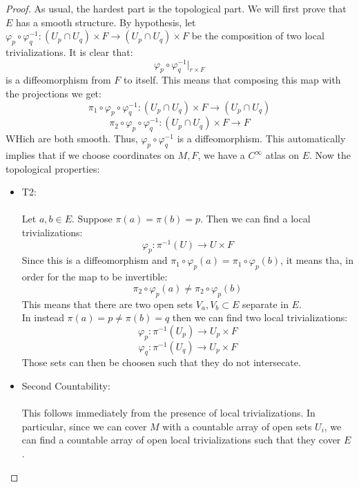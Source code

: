 \documentclass[12pt,a4paper]{report}
\theoremstyle{definition}
\theoremstyle{Theorem}
\theoremstyle{definition}
\theoremstyle{definition}
\begin{document}
	\begin{proof}
		As usual, the hardest part is the topological part. We will first prove that $E$ has a smooth structure. By hypothesis, let $\varphi_p\circ \varphi_q^{-1}:(U_p\cap U_q)\times F\rightarrow (U_p\cap U_q)\times F$ be the composition of two local trivializations. It is clear that:
		$$\varphi_p\circ \varphi_q^{-1}\bigg|_{r\times F}$$
		is a diffeomorphism from $F$ to itself. This means that composing this map with the projections we get:
		$$\pi_1\circ \varphi_p\circ \varphi_q^{-1}:(U_p\cap U_q)\times F\rightarrow (U_p\cap U_q)$$
		$$\pi_2\circ \varphi_p\circ \varphi_q^{-1}:(U_p\cap U_q)\times F\rightarrow F$$
		WHich are both smooth. Thus, $\varphi_p\circ \varphi_q^{-1}$ is a diffeomorphism. This automatically implies that if we choose coordinates on $M,F$, we have a $C^\infty$ atlas on $E$. Now the topological properties:
		\begin{itemize}
			\item T2:\\
			\\
			Let $a,b\in E$. Suppose $\pi(a)=\pi(b)=p$. Then we can find a local trivializations:
			$$\varphi_p:\pi^{-1}(U)\rightarrow U\times F$$
			Since this is a diffeomorphism and $\pi_1\circ \varphi_p(a)=\pi_1\circ\varphi_p(b)$, it means tha, in order for the map to be invertible:
			$$\pi_2\circ \varphi_p(a)\neq \pi_2\circ \varphi_p(b)$$
			This means that there are two open sets $V_a,V_b\subset E$ separate in $E$.\\
			In instead $\pi(a)=p\neq \pi(b)=q$ then we can find two local trivializations:
			$$\varphi_p:\pi^{-1}(U_p)\rightarrow U_p\times F$$
			$$\varphi_q:\pi^{-1}(U_q)\rightarrow U_p\times F$$
			Those sets can then be choosen such that they do not intersecate.
			\item Second Countability:\\
			\\
			This follows immediately from the presence of local trivializations. In particular, since we can cover $M$ with a countable array of open sets $U_i$, we can find a countable array of open local trivializations such that they cover $E$.
		\end{itemize}
	\end{proof}
\end{document}
